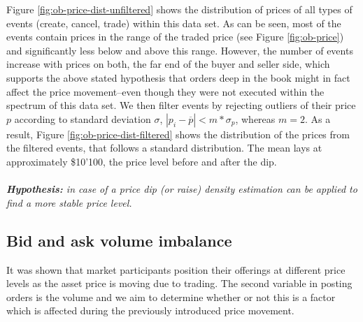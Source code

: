 Figure \ref{fig:ob-price-dist-unfiltered} shows the distribution of prices of all types of events (create, cancel, trade) within this data set.
As can be seen, most of the events contain prices in the range of the traded price (see Figure \ref{fig:ob-price}) and significantly less below and above this range.
However, the number of events increase with prices on both, the far end of the buyer and seller side, which supports the above stated hypothesis that orders deep in the book might in fact affect the price movement--even though they were not executed within the spectrum of this data set.
We then filter events by rejecting outliers of their price $p$ according to standard deviation $\sigma$, $ |p_i - \overline{p}| < m * \sigma_{p} $, whereas $m=2$.
As a result, Figure \ref{fig:ob-price-dist-filtered} shows the distribution of the prices from the filtered events, that follows a standard distribution.
The mean lays at approximately \$10'100, the price level before and after the dip.
\\
\\
\textit{\textbf{Hypothesis:} in case of a price dip (or raise) density estimation can be applied to find a more stable price level.}

\subsection{Bid and ask volume imbalance}

It was shown that market participants position their offerings at different price levels as the asset price is moving due to trading.
The second variable in posting orders is the volume and we aim to determine whether or not this is a factor which is affected during the previously introduced price movement.

